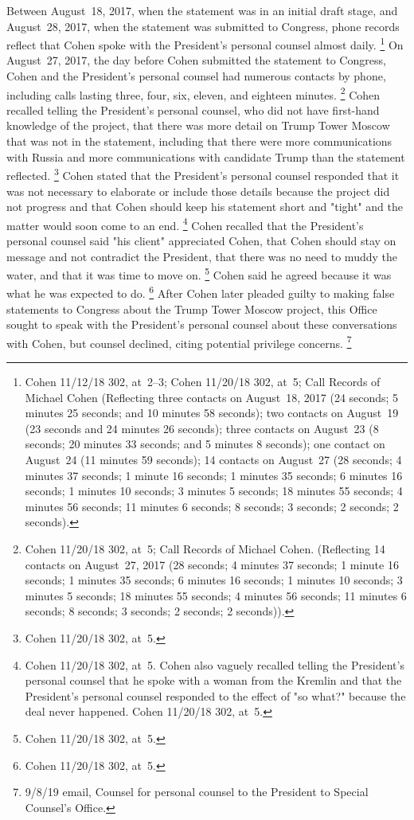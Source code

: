 Between August~18, 2017, when the statement was in an initial draft stage, and August~28, 2017, when the statement was submitted to Congress, phone records reflect that Cohen spoke with the President's personal counsel almost daily.%
\footnote{Cohen 11/12/18 302, at~2--3;
Cohen 11/20/18 302, at~5;
Call Records of Michael Cohen (Reflecting three contacts on August~18, 2017 (24 seconds;
5 minutes 25 seconds;
and 10 minutes 58 seconds);
two contacts on August~19 (23 seconds and 24 minutes 26 seconds);
three contacts on August~23 (8 seconds; 20 minutes 33 seconds;
and 5 minutes 8 seconds);
one contact on August~24 (11 minutes 59 seconds);
14 contacts on August~27 (28 seconds;
4 minutes 37 seconds;
1 minute 16 seconds;
1 minutes 35 seconds;
6 minutes 16 seconds;
1 minutes 10 seconds;
3 minutes 5 seconds;
18 minutes 55 seconds;
4 minutes 56 seconds;
11 minutes 6 seconds;
8 seconds;
3 seconds;
2 seconds;
2 seconds).}
On August~27, 2017, the day before Cohen submitted the statement to Congress, Cohen and the President's personal counsel had numerous contacts by phone, including calls lasting three, four, six, eleven, and eighteen minutes.%
\footnote{Cohen 11/20/18 302, at~5;
Call Records of Michael Cohen.
(Reflecting 14 contacts on August~27, 2017 (28 seconds;
4 minutes 37 seconds;
1 minute 16 seconds;
1 minutes 35 seconds;
6 minutes 16 seconds;
1 minutes 10 seconds;
3 minutes 5 seconds;
18 minutes 55 seconds;
4 minutes 56 seconds;
11 minutes 6 seconds;
8 seconds;
3 seconds;
2 seconds;
2 seconds)).
}
Cohen recalled telling the President's personal counsel, who did not have first-hand knowledge of the project, that there was more detail on Trump Tower Moscow that was not in the statement, including that there were more communications with Russia and more communications with candidate Trump than the statement reflected.%
\footnote{Cohen 11/20/18 302, at~5.}
Cohen stated that the President's personal counsel responded that it was not necessary to elaborate or include those details because the project did not progress and that Cohen should keep his statement short and "tight" and the matter would soon come to an end.%
\footnote{Cohen 11/20/18 302, at~5.
Cohen also vaguely recalled telling the President's personal counsel that he spoke with a woman from the Kremlin and that the President's personal counsel responded to the effect of "so what?" because the deal never happened.
Cohen 11/20/18 302, at~5.}
Cohen recalled that the President's personal counsel said "his client" appreciated Cohen, that Cohen should stay on message and not contradict the President, that there was no need to muddy the water, and that it was time to move on.%
\footnote{Cohen 11/20/18 302, at~5.}
Cohen said he agreed because it was what he was expected to do.%
\footnote{Cohen 11/20/18 302, at~5.}
After Cohen later pleaded guilty to making false statements to Congress about the Trump Tower Moscow project, this Office sought to speak with the President's personal counsel about these conversations with Cohen, but counsel declined, citing potential privilege concerns.%
\footnote{9/8/19 email, Counsel for personal counsel to the President to Special Counsel's Office.}


